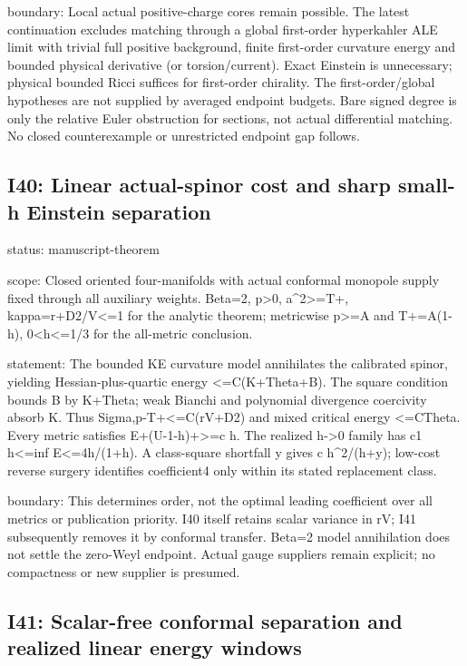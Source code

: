 \documentclass[
  10pt,
]{article}
\begin{document}
boundary: Local actual positive-charge cores remain possible. The latest
continuation excludes matching through a global first-order hyperkahler
ALE limit with trivial full positive background, finite first-order
curvature energy and bounded physical derivative (or torsion/current).
Exact Einstein is unnecessary; physical bounded Ricci suffices for
first-order chirality. The first-order/global hypotheses are not
supplied by averaged endpoint budgets. Bare signed degree is only the
relative Euler obstruction for sections, not actual differential
matching. No closed counterexample or unrestricted endpoint gap follows.

\hypertarget{i40-linear-actual-spinor-cost-and-sharp-small-h-einstein-separation}{%
\subsection{I40: Linear actual-spinor cost and sharp small-h Einstein
separation}\label{i40-linear-actual-spinor-cost-and-sharp-small-h-einstein-separation}}

status: manuscript-theorem

scope: Closed oriented four-manifolds with actual conformal monopole
supply fixed through all auxiliary weights. Beta=2, p\textgreater0,
a\^{}2\textgreater=T+, kappa=r+D2/V\textless=1 for the analytic theorem;
metricwise p\textgreater=A and T+=A(1-h), 0\textless h\textless=1/3 for
the all-metric conclusion.

statement: The bounded KE curvature model annihilates the calibrated
spinor, yielding Hessian-plus-quartic energy \textless=C(K+Theta+B). The
square condition bounds B by K+Theta; weak Bianchi and polynomial
divergence coercivity absorb K. Thus Sigma,p-T+\textless=C(rV+D2) and
mixed critical energy \textless=CTheta. Every metric satisfies
E+(U-1-h)+\textgreater=c h. The realized h-\textgreater0 family has c1
h\textless=inf E\textless=4h/(1+h). A class-square shortfall y gives c
h\^{}2/(h+y); low-cost reverse surgery identifies coefficient4 only
within its stated replacement class.

boundary: This determines order, not the optimal leading coefficient
over all metrics or publication priority. I40 itself retains scalar
variance in rV; I41 subsequently removes it by conformal transfer.
Beta=2 model annihilation does not settle the zero-Weyl endpoint. Actual
gauge suppliers remain explicit; no compactness or new supplier is
presumed.

\hypertarget{i41-scalar-free-conformal-separation-and-realized-linear-energy-windows}{%
\subsection{I41: Scalar-free conformal separation and realized linear
energy
windows}\label{i41-scalar-free-conformal-separation-and-realized-linear-energy-windows}}
\end{document}
